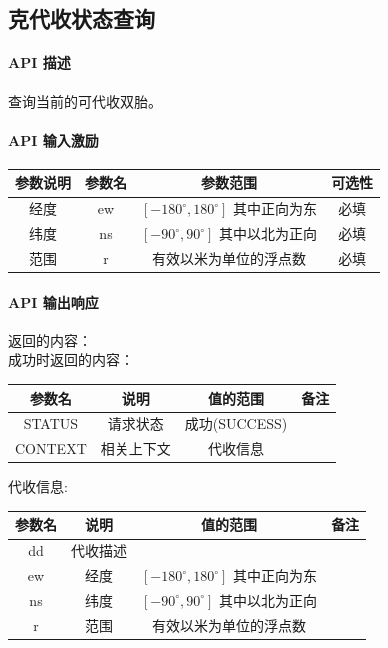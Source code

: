 \documentclass[UTF8]{article}
\def\apiintr{\paragraph{\colorbox[rgb]{1.0,0.6,0.65}{API 描述}}} %
\def\apiexc{\paragraph{\colorbox[rgb]{1,0.85,0.45}{API 输入激励}}} %
\def\apiresp{\paragraph{\colorbox[rgb]{0.9,0.9,1}{API 输出响应}}} %
\def\成功{\colorbox[rgb]{0.4,1,0.5}{成功}}
\def\成功V{成功(SUCCESS)}
\begin{document}
    \subsection{克代收状态查询}
    \apiintr
    查询当前的可代收双胎。
    \apiexc
    \begin{tabular}{|c|c|c|c|}
        \hline \rule[-2ex]{0pt}{5.5ex} 参数说明 & 参数名 & 参数范围 & 可选性 \\
        \hline \rule[-2ex]{0pt}{5.5ex} 经度 & ew & $[-180^\circ,180^\circ]$ 其中正向为东 & 必填 \\
        \hline \rule[-2ex]{0pt}{5.5ex} 纬度 & ns & $[-90^\circ,90^\circ]$ 其中以北为正向 & 必填 \\
        \hline \rule[-2ex]{0pt}{5.5ex} 范围 & r & 有效以米为单位的浮点数 & 必填 \\
        \hline 
    \end{tabular}
    \apiresp
    返回的内容：\\
    \成功 时返回的内容：\\
    \begin{tabular}{|c|c|c|c|}
        \hline \rule[-2ex]{0pt}{5.5ex} 参数名 & 说明 & 值的范围 & 备注 \\
        \hline \rule[-2ex]{0pt}{5.5ex} STATUS & 请求状态 & \成功V &  \\ 
        \hline \rule[-2ex]{0pt}{5.5ex} CONTEXT & 相关上下文 & 代收信息 &  \\
        \hline 
    \end{tabular} 
    \par 代收信息: \\
    \begin{tabular}{|c|c|c|c|}
        \hline \rule[-2ex]{0pt}{5.5ex} 参数名 & 说明 & 值的范围 & 备注 \\
        \hline \rule[-2ex]{0pt}{5.5ex} dd & 代收描述 &  &  \\
        \hline \rule[-2ex]{0pt}{5.5ex} ew & 经度 & $[-180^\circ,180^\circ]$ 其中正向为东 &  \\
        \hline \rule[-2ex]{0pt}{5.5ex} ns & 纬度 & $[-90^\circ,90^\circ]$ 其中以北为正向 &  \\
        \hline \rule[-2ex]{0pt}{5.5ex} r & 范围 & 有效以米为单位的浮点数 &  \\
        \hline 
    \end{tabular} 
\end{document}
